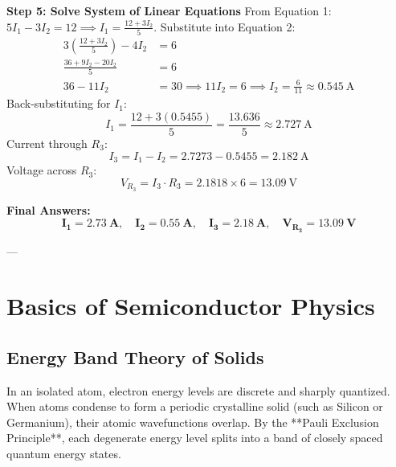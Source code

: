 \begin{example}
\textbf{Step 5: Solve System of Linear Equations}
From Equation 1: $5I_1 - 3I_2 = 12 \implies I_1 = \frac{12 + 3I_2}{5}$.
Substitute into Equation 2:
\begin{align*}
    3\left(\frac{12 + 3I_2}{5}\right) - 4I_2 &= 6 \\
    \frac{36 + 9I_2 - 20I_2}{5} &= 6 \\
    36 - 11I_2 &= 30 \implies 11I_2 = 6 \implies I_2 = \frac{6}{11} \approx \SI{0.545}{\ampere}
\end{align*}
Back-substituting for $I_1$:
\begin{equation*}
    I_1 = \frac{12 + 3(0.5455)}{5} = \frac{13.636}{5} \approx \SI{2.727}{\ampere}
\end{equation*}
Current through $R_3$:
\begin{equation*}
    I_3 = I_1 - I_2 = 2.7273 - 0.5455 = \SI{2.182}{\ampere}
\end{equation*}
Voltage across $R_3$:
\begin{equation*}
    V_{R_3} = I_3 \cdot R_3 = 2.1818 \times 6 = \SI{13.09}{\volt}
\end{equation*}

\textbf{Final Answers:}
$$\mathbf{I_1 = \SI{2.73}{\ampere}, \quad I_2 = \SI{0.55}{\ampere}, \quad I_3 = \SI{2.18}{\ampere}, \quad V_{R_3} = \SI{13.09}{\volt}}$$
\end{example}

---

\section{Basics of Semiconductor Physics}

\subsection{Energy Band Theory of Solids}
In an isolated atom, electron energy levels are discrete and sharply quantized. When atoms condense to form a periodic crystalline solid (such as Silicon or Germanium), their atomic wavefunctions overlap. By the **Pauli Exclusion Principle**, each degenerate energy level splits into a band of closely spaced quantum energy states.

